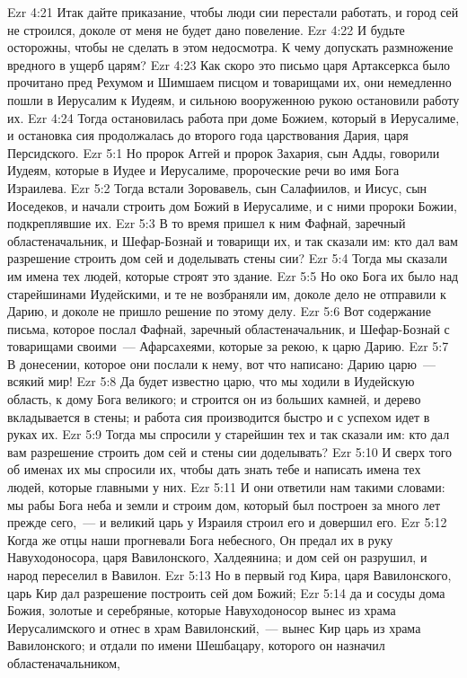 \vs Ezr 4:21 Итак дайте приказание, чтобы люди сии перестали работать, и  город сей не строился, доколе от меня не будет дано повеление.
\vs Ezr 4:22 И будьте осторожны, чтобы не сделать в этом недосмотра. К чему допускать размножение вредного в ущерб царям?
\rsbpar\vs Ezr 4:23 Как скоро это письмо царя Артаксеркса было прочитано пред Рехумом и Шимшаем писцом и товарищами их, они немедленно пошли в Иерусалим к Иудеям, и сильною вооруженною рукою остановили работу их.
\vs Ezr 4:24 Тогда остановилась работа при доме Божием, который в Иерусалиме, и остановка сия продолжалась до второго года царствования Дария, царя Персидского.
\vs Ezr 5:1 Но пророк Аггей и пророк Захария, сын Адды, говорили Иудеям, которые в Иудее и Иерусалиме, пророческие речи во имя Бога Израилева.
\vs Ezr 5:2 Тогда встали Зоровавель, сын Салафиилов, и Иисус, сын Иоседеков, и начали строить дом Божий в Иерусалиме, и с ними пророки Божии, подкреплявшие их.
\rsbpar\vs Ezr 5:3 В то время пришел к ним Фафнай, заречный областеначальник, и Шефар-Бознай и товарищи их, и так сказали им: кто дал вам разрешение строить дом сей и доделывать стены сии?
\vs Ezr 5:4 Тогда мы сказали им имена тех людей, которые строят это здание.
\vs Ezr 5:5 Но око Бога их было над старейшинами Иудейскими, и те не возбраняли им, доколе дело не отправили к Дарию, и доколе не пришло решение по этому делу.
\rsbpar\vs Ezr 5:6 Вот содержание письма, которое послал Фафнай, заречный областеначальник, и Шефар-Бознай с товарищами своими~--- Афарсахеями, которые за рекою, к царю Дарию.
\vs Ezr 5:7 В донесении, которое они послали к нему, вот что написано: Дарию царю~--- всякий мир!
\vs Ezr 5:8 Да будет известно царю, что мы ходили в Иудейскую область, к дому Бога великого; и строится он из больших камней, и дерево вкладывается в стены; и работа сия производится быстро и с успехом идет в руках их.
\vs Ezr 5:9 Тогда мы спросили у старейшин тех и так сказали им: кто дал вам разрешение строить дом сей и стены сии доделывать?
\vs Ezr 5:10 И сверх того об именах их мы спросили их, чтобы дать знать тебе и написать имена тех людей, которые главными у них.
\vs Ezr 5:11 И они ответили нам такими словами: мы рабы Бога неба и земли и строим дом, который был построен за много лет прежде сего,~--- и великий царь у Израиля строил его и довершил его.
\vs Ezr 5:12 Когда же отцы наши прогневали Бога небесного, Он предал их в руку Навуходоносора, царя Вавилонского, Халдеянина; и дом сей он разрушил, и народ переселил в Вавилон.
\vs Ezr 5:13 Но в первый год Кира, царя Вавилонского, царь Кир дал разрешение построить сей дом Божий;
\vs Ezr 5:14 да и сосуды дома Божия, золотые и серебряные, которые Навуходоносор вынес из храма Иерусалимского и отнес в храм Вавилонский,~--- вынес Кир царь из храма Вавилонского; и отдали  по имени Шешбацару, которого он назначил областеначальником,
